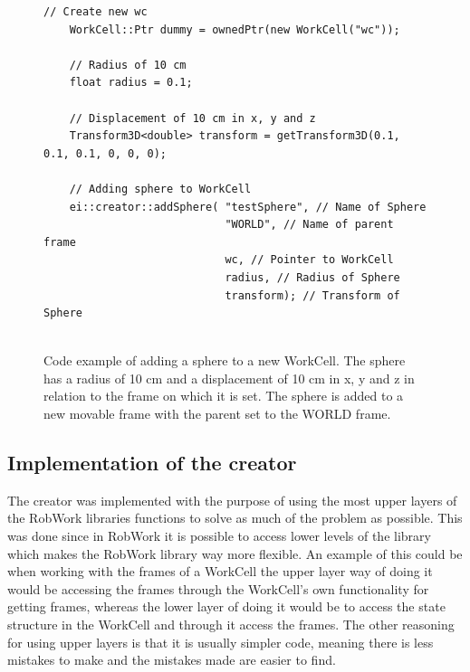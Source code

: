 \begin{figure}[h]
	\centering
	\lstset{language=C++} 
	\begin{lstlisting}[frame=single]
	// Create new wc
	WorkCell::Ptr dummy = ownedPtr(new WorkCell("wc"));
	 
	// Radius of 10 cm
	float radius = 0.1;
	
	// Displacement of 10 cm in x, y and z
	Transform3D<double> transform = getTransform3D(0.1, 0.1, 0.1, 0, 0, 0); 
	
	// Adding sphere to WorkCell
	ei::creator::addSphere( "testSphere", // Name of Sphere
							"WORLD", // Name of parent frame
							wc, // Pointer to WorkCell
							radius, // Radius of Sphere
							transform); // Transform of Sphere
	 
	\end{lstlisting}
	\caption{Code example of adding a sphere to a new WorkCell. The sphere has a radius of 10 cm and a displacement of 10 cm in x, y and z in relation to the frame on which it is set. The sphere is added to a new movable frame with the parent set to the WORLD frame.}
	\label{fig:CodeExampleAddSphere}
\end{figure}

\subsection{Implementation of the creator}
The creator was implemented with the purpose of using the most upper layers of the RobWork libraries functions to solve as much of the problem as possible. This was done since in RobWork it is possible to access lower levels of the library which makes the RobWork library way more flexible. An example of this could be when working with the frames of a WorkCell the upper layer way of doing it would be accessing the frames through the WorkCell's own functionality for getting frames, whereas the lower layer of doing it would be to access the state structure in the WorkCell and through it access the frames. The other reasoning for using upper layers is that it is usually simpler code, meaning there is less mistakes to make and the mistakes made are easier to find.\\

